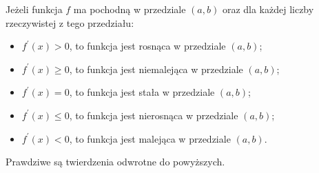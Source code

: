 \documentclass[14pt,a4paper]{extarticle}
\begin{document}
Jeżeli funkcja $f$ ma pochodną w przedziale $(a, b)$ oraz dla każdej liczby rzeczywistej z tego przedziału:
\begin{itemize}
   \item $f^{\prime}(x) > 0$, to funkcja jest rosnąca w przedziale $(a, b)$;
   \item $f^{\prime}(x) \geq 0$, to funkcja jest niemalejąca w przedziale $(a, b)$;
   \item $f^{\prime}(x) = 0$, to funkcja jest stała w przedziale $(a, b)$;
   \item $f^{\prime}(x) \leq 0$, to funkcja jest nierosnąca w przedziale $(a, b)$;
   \item $f^{\prime}(x) < 0$, to funkcja jest malejąca w przedziale $(a, b)$.
\end{itemize}

Prawdziwe są twierdzenia odwrotne do powyższych.
\end{document}
